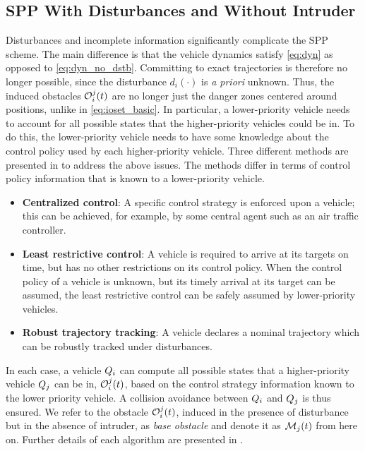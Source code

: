 \subsection{SPP With Disturbances and Without Intruder\label{sec:distb}}
Disturbances and incomplete information significantly complicate the SPP scheme. The main difference is that the vehicle dynamics satisfy \eqref{eq:dyn} as opposed to \eqref{eq:dyn_no_dstb}. Committing to exact trajectories is therefore no longer possible, since the disturbance $d_i(\cdot)$ is \textit{a priori} unknown. Thus, the induced obstacles $\mathcal{O}_i^j(t)$ are no longer just the danger zones centered around positions, unlike in \eqref{eq:ioset_basic}. In particular, a lower-priority vehicle needs to account for all possible states that the higher-priority vehicles could be in. To do this, the lower-priority vehicle needs to have some knowledge about the control policy used by each higher-priority vehicle. Three different methods are presented in \cite{Bansal2017} to address the above issues. The methods differ in terms of control policy information that is known to a lower-priority vehicle.
\begin{itemize}
\item \textbf{Centralized control}: A specific control strategy is enforced upon a vehicle; this can be achieved, for example, by some central agent such as an air traffic controller. 
\item \textbf{Least restrictive control}: A vehicle is required to arrive at its targets on time, but has no other restrictions on its control policy. When the control policy of a vehicle is unknown, but its timely arrival at its target can be assumed, the least restrictive control can be safely assumed by lower-priority vehicles.
\item \textbf{Robust trajectory tracking}: A vehicle declares a nominal trajectory which can be robustly tracked under disturbances.
\end{itemize}
In each case, a vehicle $Q_i$ can compute all possible states that a higher-priority vehicle $Q_j$ can be in, $\mathcal{O}_i^j(t)$, based on the control strategy information known to the lower priority vehicle. A collision avoidance between $Q_i$ and $Q_j$ is thus ensured. We refer to the obstacle $\mathcal{O}_i^j(t)$, induced in the presence of disturbance but in the absence of intruder, as \textit{base obstacle} and denote it as $\mathcal{M}_j(t)$ from here on. Further details of each algorithm are presented in \cite{Bansal2017}.
